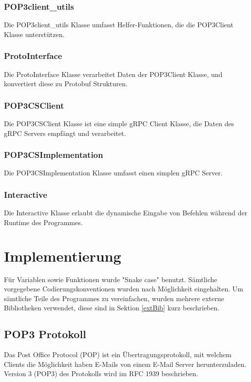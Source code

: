 \documentclass[12pt, letterpaper]{article}
\begin{document}
\subsubsection{POP3client\_utils}
Die POP3client\_utils Klasse umfasst Helfer-Funktionen, die die POP3Client Klasse unterstützen.

\subsubsection{ProtoInterface}
Die ProtoInterface Klasse verarbeitet Daten der POP3Client Klasse, und konvertiert diese zu Protobuf Strukturen.

\subsubsection{POP3CSClient}
Die POP3CSClient Klasse ist eine simple gRPC Client Klasse, die Daten des gRPC Servers empfängt und verarbeitet.

\subsubsection{POP3CSImplementation}
Die POP3CSImplementation Klasse umfasst einen simplen gRPC Server.

\subsubsection{Interactive}
Die Interactive Klasse erlaubt die dynamische Eingabe von Befehlen während der Runtime des Programmes. 

\section{Implementierung}
Für Variablen sowie Funktionen wurde "Snake case" benutzt. Sämtliche vorgegebene Codierungskonventionen wurden nach Möglichkeit eingehalten. Um sämtliche Teile des Programmes zu vereinfachen, wurden mehrere externe Bibliotheken verwendet, diese sind in Sektion \ref{extBib} kurz beschrieben. 

\subsection{POP3 Protokoll}
Das Post Office Protocol (POP) ist ein Übertragungsprotokoll, mit welchem Clients die Möglichkeit haben E-Mails von einem E-Mail Server herunterzuladen. Version 3 (POP3) des Protokolls wird im RFC 1939\cite{rfc1939} beschrieben. 
\end{document}
